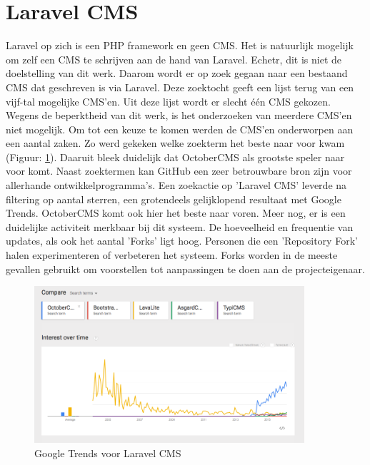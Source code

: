 \section{Laravel CMS}
Laravel op zich is een PHP framework en geen CMS. Het is natuurlijk mogelijk om zelf een CMS te schrijven aan de hand van Laravel. Echetr,  dit is niet de doelstelling van dit werk. Daarom wordt er op zoek gegaan naar een bestaand CMS dat geschreven is via Laravel. Deze zoektocht geeft een lijst terug van een vijf-tal mogelijke CMS'en. Uit deze lijst wordt er slecht één CMS gekozen. Wegens de beperktheid van dit werk, is het onderzoeken van meerdere CMS'en niet mogelijk. 
\newline\newline
Om tot een keuze te komen werden de CMS'en onderworpen aan een aantal zaken. Zo werd gekeken welke zoekterm het beste naar voor kwam (Figuur: \ref{fig:Google Trends Laravel CMS}). Daaruit bleek duidelijk dat OctoberCMS als grootste speler naar voor komt. Naast zoektermen kan GitHub een zeer betrouwbare bron zijn voor allerhande ontwikkelprogramma's. Een zoekactie op 'Laravel CMS' leverde na filtering op aantal sterren, een grotendeels gelijklopend resultaat met Google Trends.
\newline\newline
OctoberCMS komt ook hier het beste naar voren. Meer nog, er is een duidelijke activiteit merkbaar bij dit systeem. De hoeveelheid en frequentie van updates, als ook het aantal 'Forks' ligt hoog. Personen die een 'Repository Fork' halen experimenteren of verbeteren het systeem. Forks worden in de meeste gevallen gebruikt om voorstellen tot aanpassingen te doen aan de projecteigenaar.
\newline\newline

\begin{figure}[!ht]
  \includegraphics[width=100mm]{img/googletrends_laravelcms.png}
  \centering
  \caption{Google Trends voor Laravel CMS}
  \label{fig:Google Trends Laravel CMS}
\end{figure}

